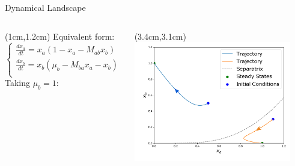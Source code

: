 \documentclass[15pt]{beamer}
\begin{document}
\begin{frame}{Dynamical Landscape}
\begin{columns}

\begin{textblock*}{6cm}(1cm,1.2cm)
Equivalent form:
\[
 \begin{cases}
       \frac{dx_a}{dt} = x_a(1-x_a-M_{ab}x_b)\\
       \frac{dx_b}{dt} = x_b(\mu_b-M_{ba}x_a-x_b)\\
 \end{cases}
\]
Taking $\mu_b = 1$:
\end{textblock*}
\begin{textblock*}{10cm}(3.4cm,3.1cm) %
	 \includegraphics[width=0.9\textwidth]{example_plot}\\
	\end{textblock*}
\end{columns}
\end{frame}
\end{document}
